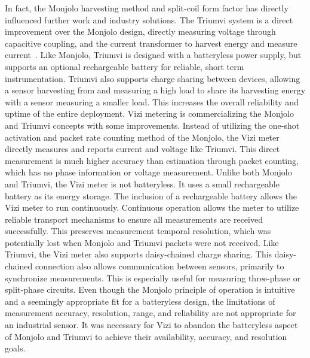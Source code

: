In fact,
the Monjolo harvesting method and split-coil form factor has directly influenced further work and industry solutions.
The Triumvi system is a direct improvement over the Monjolo design, directly measuring voltage through capacitive coupling, and the current transformer to harvest energy and measure current~\cite{campbell2018energy}.
Like Monjolo, Triumvi is designed with a batteryless power supply, but supports an optional rechargeable battery for reliable, short term instrumentation.
Triumvi also supports charge sharing between devices, 
allowing a sensor harvesting from and measuring a high load to share its harvesting energy with a sensor measuring a smaller load.
This increases the overall reliability and uptime of the entire deployment.
Vizi metering is commercializing the Monjolo and Triumvi concepts with some improvements.
Instead of utilizing the one-shot activation and packet rate counting method of the Monjolo, the Vizi meter directly measures and reports current and voltage like Triumvi. This direct measurement is much higher accuracy than estimation through packet counting, which has no phase information or voltage measurement.
Unlike both Monjolo and Triumvi, the Vizi meter is not batteryless. It uses a small rechargeable battery as its energy storage.
The inclusion of a rechargeable battery allows the Vizi meter to run continuously.
Continuous operation allows the meter to utilize reliable transport mechanisms to ensure all measurements are received successfully.
This preserves measurement temporal resolution, which was potentially lost when Monjolo and Triumvi packets were not received.
Like Triumvi, the Vizi meter also supports daisy-chained charge sharing.
This daisy-chained connection also allows communication between sensors, primarily to synchronize measurements. This is especially useful for measuring three-phase or split-phase circuits.
Even though the Monjolo principle of operation is intuitive and a seemingly appropriate fit for a batteryless design, the limitations of measurement accuracy, resolution, range, and reliability are not appropriate for an industrial sensor. It was necessary for Vizi to abandon the batteryless aspect of Monjolo and Triumvi to achieve their availability, accuracy, and resolution goals.

